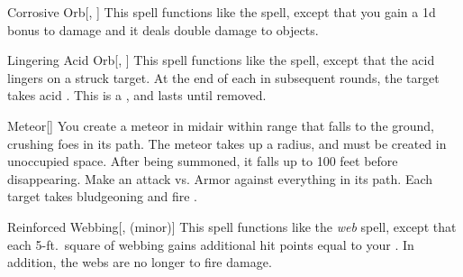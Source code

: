 \lowercase{\hypertarget{spell:Corrosive Orb}{}}\label{spell:Corrosive Orb}
\begin{apability}[\nth{3}]{\hypertarget{spell:Corrosive Orb}{Corrosive Orb}}[, ]
This spell functions like the  spell, except that you gain a \plus1d bonus to damage and it deals double damage to objects.
\end{apability}
\vspace{0.25em}



\lowercase{\hypertarget{spell:Lingering Acid Orb}{}}\label{spell:Lingering Acid Orb}
\begin{apability}[\nth{3}]{\hypertarget{spell:Lingering Acid Orb}{Lingering Acid Orb}}[, ]
This spell functions like the  spell, except that the acid lingers on a struck target.
At the end of each  in subsequent rounds, the target takes acid .
This is a , and lasts until removed.
\end{apability}
\vspace{0.25em}



\lowercase{\hypertarget{spell:Meteor}{}}\label{spell:Meteor}
\begin{apability}[\nth{3}]{\hypertarget{spell:Meteor}{Meteor}}[]
You create a meteor in midair within \rngmed range that falls to the ground, crushing foes in its path.
The meteor takes up a \areamed radius, and must be created in unoccupied space.
After being summoned, it falls up to 100 feet before disappearing.
Make an attack vs. Armor against everything in its path.
\hit Each target takes bludgeoning and fire .
\end{apability}
\vspace{0.25em}



\lowercase{\hypertarget{spell:Reinforced Webbing}{}}\label{spell:Reinforced Webbing}
\begin{apability}[\nth{3}]{\hypertarget{spell:Reinforced Webbing}{Reinforced Webbing}}[,  (minor)]
This spell functions like the \textit{web} spell, except that each 5-ft.\ square of webbing gains additional hit points equal to your .
In addition, the webs are no longer  to fire damage.
\end{apability}
\vspace{0.25em}



